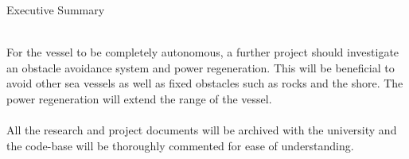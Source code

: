 \begin{Summary}{Executive Summary}
\begin{SumTable}
		\hline%
		\\
		\hline%
		For the vessel to be completely autonomous, a further project should investigate an obstacle avoidance system and power regeneration. This will be beneficial to avoid other sea vessels as well as fixed obstacles such as rocks and the shore. The power regeneration will extend the range of the vessel.\\
		
		\hline%
		\\
		\hline%
		All the research and project documents will be archived with the university and the code-base will be thoroughly commented for ease of understanding.\\
		
		\hline%
	\end{SumTable}
	
	
	\vspace{1.5cm}
	\SumSignatures
	
\end{Summary}

\endinput
